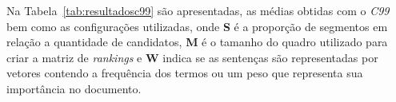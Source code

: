 





Na Tabela~\ref{tab:resultadosc99} são apresentadas, as médias obtidas com o \textit{C99} bem como as configurações utilizadas, onde \textbf{S} é a proporção de segmentos em relação a quantidade de candidatos, \textbf{M} é o tamanho do quadro utilizado para criar a matriz de \textit{rankings} e \textbf{W} indica se as sentenças são representadas por vetores contendo a frequência dos termos ou um peso que representa sua importância no documento. %





